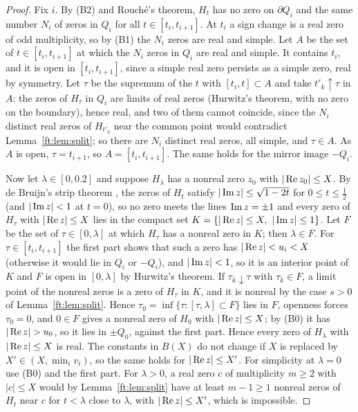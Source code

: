 \begin{proof}
Fix $i$. By (B2) and Rouch\'e's theorem, $H_t$ has no zero on $\partial Q_i$ and the same number $N_i$ of zeros in $Q_i$ for all $t\in[t_i,t_{i+1}]$. At $t_i$ a sign change is a real zero of odd multiplicity, so by (B1) the $N_i$ zeros are real and simple. Let $A$ be the set of $t\in[t_i,t_{i+1}]$ at which the $N_i$ zeros in $Q_i$ are real and simple. It contains $t_i$, and it is open in $[t_i,t_{i+1}]$, since a simple real zero persists as a simple zero, real by symmetry. Let $\tau$ be the supremum of the $t$ with $[t_i,t]\subset A$ and take $t'_k\uparrow\tau$ in $A$: the zeros of $H_\tau$ in $Q_i$ are limits of real zeros (Hurwitz's theorem, with no zero on the boundary), hence real, and two of them cannot coincide, since the $N_i$ distinct real zeros of $H_{t'_k}$ near the common point would contradict Lemma~\ref{ft:lem:split}; so there are $N_i$ distinct real zeros, all simple, and $\tau\in A$. As $A$ is open, $\tau=t_{i+1}$, so $A=[t_i,t_{i+1}]$. The same holds for the mirror image $-Q_i$.

Now let $\lambda\in[0,0.2]$ and suppose $H_\lambda$ has a nonreal zero $z_0$ with $|\operatorname{Re} z_0|\le X$. By de Bruijn's strip theorem \cite[Theorem 13]{deBruijn}, the zeros of $H_t$ satisfy $|\operatorname{Im} z|\le\sqrt{1-2t}$ for $0\le t\le\frac12$ (and $|\operatorname{Im} z|<1$ at $t=0$), so no zero meets the lines $\operatorname{Im} z=\pm1$ and every zero of $H_\tau$ with $|\operatorname{Re} z|\le X$ lies in the compact set $K=\{|\operatorname{Re} z|\le X,\ |\operatorname{Im} z|\le1\}$. Let $F$ be the set of $\tau\in[0,\lambda]$ at which $H_\tau$ has a nonreal zero in $K$; then $\lambda\in F$. For $\tau\in[t_i,t_{i+1}]$ the first part shows that such a zero has $|\operatorname{Re} z|<u_i<X$ (otherwise it would lie in $Q_i$ or $-Q_i$), and $|\operatorname{Im} z|<1$, so it is an interior point of $K$ and $F$ is open in $[0,\lambda]$ by Hurwitz's theorem. If $\tau_k\downarrow\tau$ with $\tau_k\in F$, a limit point of the nonreal zeros is a zero of $H_\tau$ in $K$, and it is nonreal by the case $s>0$ of Lemma~\ref{ft:lem:split}. Hence $\tau_0=\inf\{\tau:[\tau,\lambda]\subset F\}$ lies in $F$, openness forces $\tau_0=0$, and $0\in F$ gives a nonreal zero of $H_0$ with $|\operatorname{Re} z|\le X$; by (B0) it has $|\re z|>u_0$, so it lies in $\pm Q_0$, against the first part. Hence every zero of $H_\lambda$ with $|\operatorname{Re} z|\le X$ is real. The constants in $B(X)$ do not change if $X$ is replaced by $X'\in(X,\min_iv_i)$, so the same holds for $|\operatorname{Re} z|\le X'$. For simplicity at $\lambda=0$ use (B0) and the first part. For $\lambda>0$, a real zero $c$ of multiplicity $m\ge2$ with $|c|\le X$ would by Lemma~\ref{ft:lem:split} have at least $m-1\ge1$ nonreal zeros of $H_t$ near $c$ for $t<\lambda$ close to $\lambda$, with $|\operatorname{Re} z|\le X'$, which is impossible.
\end{proof}

